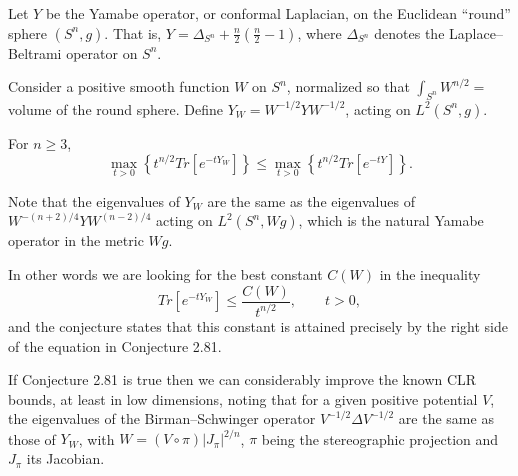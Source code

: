 \documentclass[12pt,letterpaper, reqno]{amsart}
\begin{document}
\begin{problemblock} 
Let $Y$ be the Yamabe operator, or conformal Laplacian, on the
Euclidean ``round'' sphere $(S^n,g)$. That is, $Y = \Delta_{S^n} +
\frac{n}{2} \left( \frac{n}{2}-1 \right)$, where $\Delta_{S^n}$
denotes the Laplace--Beltrami operator on $S^n$.

Consider a positive smooth function $W$ on $S^n$, normalized so that
$\int_{S^n} W^{n/2}=$volume of the round sphere. Define
$Y_W=W^{-1/2}YW^{-1/2}$, acting on $L^2(S^n,g)$.

\begin{conjecture}[2.81] 
 For $n \geq 3$,
$$
\max_{t>0} \left\{ t^{n/2} {Tr}[e^{-tY_W}] \right\} \leq
\max_{t>0} \left\{ t^{n/2} {Tr}[e^{-tY}]   \right\} .
$$
\end{conjecture}

\begin{distinguishedremark}
Note that the eigenvalues of $Y_W$ are the same as the eigenvalues
of $W^{-(n+2)/4}Y W^{(n-2)/4}$ acting on $L^2(S^n, W g)$, which is
the natural Yamabe operator in the metric $Wg$.

In other words we are looking for the best constant $C(W)$ in the
inequality
$$
{Tr}[e^{-tY_W}] \leq \frac{C(W)}{t^{n/2}},  \qquad t>0,
$$
and the conjecture states that this constant is attained precisely
by the right side of the equation in Conjecture 2.81.
\end{distinguishedremark}

\begin{remark}
If Conjecture 2.81 is true then we can considerably improve the known
CLR bounds, at least in low dimensions, noting that for a given
positive potential $V$, the eigenvalues of the Birman--Schwinger
operator $V^{-1/2}\Delta V^{-1/2}$ are the same as those of $Y_W$,
with $W=(V\circ\pi) |J_\pi|^{2/n}$, $\pi$ being the stereographic
projection and $J_\pi$ its Jacobian.
\end{remark}
\end{problemblock}
\end{document}

